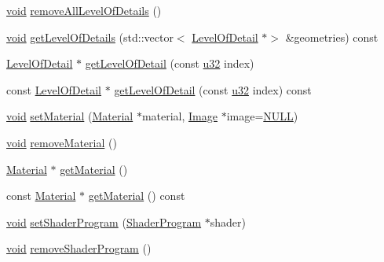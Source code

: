 \begin{DoxyCompactItemize}
\item 
\mbox{\hyperlink{_thread_8h_af1e856da2e658414cb2456cb6f7ebc66}{void}} \mbox{\hyperlink{classnjli_1_1_geometry_a95e2234f03e5a4fae599689e1545f323}{remove\+All\+Level\+Of\+Details}} ()
\item 
\mbox{\hyperlink{_thread_8h_af1e856da2e658414cb2456cb6f7ebc66}{void}} \mbox{\hyperlink{classnjli_1_1_geometry_ac205720639e55ef44ea2e8102d26fe65}{get\+Level\+Of\+Details}} (std\+::vector$<$ \mbox{\hyperlink{classnjli_1_1_level_of_detail}{Level\+Of\+Detail}} $\ast$$>$ \&geometries) const
\item 
\mbox{\hyperlink{classnjli_1_1_level_of_detail}{Level\+Of\+Detail}} $\ast$ \mbox{\hyperlink{classnjli_1_1_geometry_aec96c72c2a2a25ff38d2ab5fc0f29ebe}{get\+Level\+Of\+Detail}} (const \mbox{\hyperlink{_util_8h_a10e94b422ef0c20dcdec20d31a1f5049}{u32}} index)
\item 
const \mbox{\hyperlink{classnjli_1_1_level_of_detail}{Level\+Of\+Detail}} $\ast$ \mbox{\hyperlink{classnjli_1_1_geometry_a97ca6b5b3e6241030284eaf8a89b15d0}{get\+Level\+Of\+Detail}} (const \mbox{\hyperlink{_util_8h_a10e94b422ef0c20dcdec20d31a1f5049}{u32}} index) const
\item 
\mbox{\hyperlink{_thread_8h_af1e856da2e658414cb2456cb6f7ebc66}{void}} \mbox{\hyperlink{classnjli_1_1_geometry_a8cd2fdd337567a3ec1b6ad53e8010afa}{set\+Material}} (\mbox{\hyperlink{classnjli_1_1_material}{Material}} $\ast$material, \mbox{\hyperlink{classnjli_1_1_image}{Image}} $\ast$image=\mbox{\hyperlink{_util_8h_a070d2ce7b6bb7e5c05602aa8c308d0c4}{N\+U\+LL}})
\item 
\mbox{\hyperlink{_thread_8h_af1e856da2e658414cb2456cb6f7ebc66}{void}} \mbox{\hyperlink{classnjli_1_1_geometry_a419d020ca0b46536bb53d923fd1c7df3}{remove\+Material}} ()
\item 
\mbox{\hyperlink{classnjli_1_1_material}{Material}} $\ast$ \mbox{\hyperlink{classnjli_1_1_geometry_aeb3c06288fdf26e61eb942abc69d7d02}{get\+Material}} ()
\item 
const \mbox{\hyperlink{classnjli_1_1_material}{Material}} $\ast$ \mbox{\hyperlink{classnjli_1_1_geometry_a9eae0bae53bb1936e80a632e6fe48438}{get\+Material}} () const
\item 
\mbox{\hyperlink{_thread_8h_af1e856da2e658414cb2456cb6f7ebc66}{void}} \mbox{\hyperlink{classnjli_1_1_geometry_a49e8cb2aeb028d46a2ec9e4b45b7bb6f}{set\+Shader\+Program}} (\mbox{\hyperlink{classnjli_1_1_shader_program}{Shader\+Program}} $\ast$shader)
\item 
\mbox{\hyperlink{_thread_8h_af1e856da2e658414cb2456cb6f7ebc66}{void}} \mbox{\hyperlink{classnjli_1_1_geometry_aa4b0598066056bb2ffa97e85febadfa4}{remove\+Shader\+Program}} ()
$$
\end{DoxyCompactItemize}
